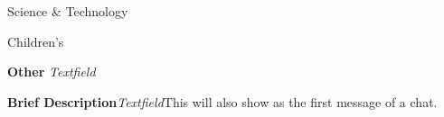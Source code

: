 \begin{CompactItemize}[leftmargin = *]
\begin{CompactItemize}
\begin{CompactItemize}
\begin{CompactItemize}
\begin{CompactItemize}
\begin{CompactItemize}
                        \item Science \& Technology
                        \item Children's
                    \end{CompactItemize}
                \end{CompactItemize}
            \end{CompactItemize}
        \end{CompactItemize}
        \item \textbf{Other} \quad\textit{Textfield}
    \end{CompactItemize}
    \item \textbf{Brief Description}\quad\textit{Textfield}\qquad This will also show as the first message of a chat.
\end{CompactItemize}
